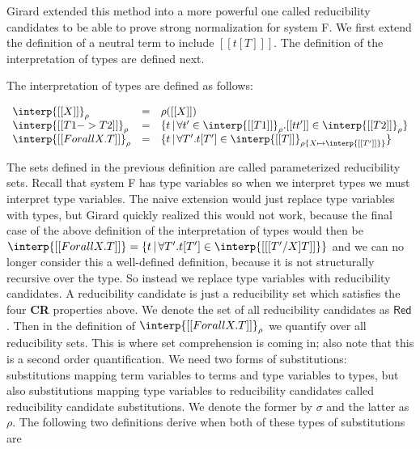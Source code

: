 Girard extended this method into a more powerful one called
reducibility candidates to be able to prove strong normalization for
system F.  We first extend the definition of a neutral term to include
$[[ t [T] ]]$.  The definition of the interpretation of types are defined
next.
\begin{definition}
  \label{def:stlc_interpretation_taits}
  The interpretation of types are defined as follows:
  \begin{center}
    \begin{math}
      \begin{array}{lll}
        \interp{[[X]]}_\rho & = & \rho([[X]])\\
        \interp{[[T1 -> T2]]}_\rho & = & \{ t\,|\,\forall t' \in \interp{[[T1]]}_\rho.
               [[t t']] \in \interp{[[T2]]}_\rho \}\\
        \interp{[[Forall X.T]]}_\rho & = & \{ t\,|\,\forall T'.
        t[T'] \in \interp{[[T]]}_{\rho\{X \mapsto \interp{[[T']]} \}} \}
      \end{array}
    \end{math}
  \end{center}
\end{definition}
The sets defined in the previous definition are called parameterized
reducibility sets.  Recall that system F has type variables so when we
interpret types we must interpret type variables.  The naive extension
would just replace type variables with types, but Girard quickly
realized this would not work, because the final case of the above
definition of the interpretation of types would then be
$\interp{[[Forall X.T]]} = \{ t\,|\,\forall T'.  t[T'] \in \interp{[[
  [T'/X]T]]} \} $ and we can no longer consider this a well-defined
definition, because it is not structurally recursive over the type.
So instead we replace type variables with reducibility candidates.  A
reducibility candidate is just a reducibility set which satisfies the
four \textbf{CR} properties above.  We denote the set of all
reducibility candidates as $\mathsf{Red}$.  Then in the definition of
$\interp{[[Forall X.T]]}_\rho$ we quantify over all reducibility sets.
This is where set comprehension is coming in; also note that this is a
second order quantification.  We need two forms of substitutions:
substitutions mapping term variables to terms and type variables to
types, but also substitutions mapping type variables to reducibility
candidates called reducibility candidate substitutions.  We denote the
former by $\sigma$ and the latter as $\rho$.  The following two
definitions derive when both of these types of substitutions are

